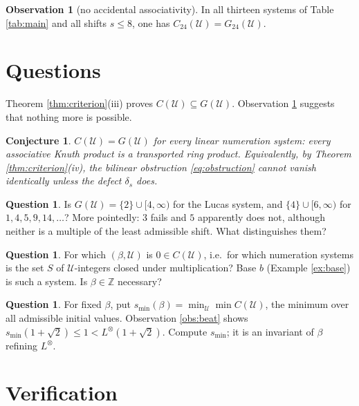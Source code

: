 \documentclass[11pt,reqno]{amsart}
\theoremstyle{plain}
\newtheorem{conjecture}[theorem]{Conjecture}
\theoremstyle{definition}
\newtheorem{observation}[theorem]{Observation}
\newtheorem{question}[theorem]{Question}
\newcommand{\Z}{\mathbb{Z}}
\newcommand{\Uu}{\mathcal{U}}
\begin{document}
\begin{observation}[no accidental associativity]\label{obs:noaccident}
In all thirteen systems of Table \ref{tab:main} and all shifts $s\le8$, one has
$C_{24}(\Uu)=G_{24}(\Uu)$.
\end{observation}

\section{Questions}

Theorem \ref{thm:criterion}(iii) proves $C(\Uu)\subseteq G(\Uu)$. Observation
\ref{obs:noaccident} suggests that nothing more is possible.

\begin{conjecture}\label{conj:noaccident}
$C(\Uu)=G(\Uu)$ for every linear numeration system: every associative Knuth product is a transported
ring product. Equivalently, by Theorem \ref{thm:criterion}(iv), the bilinear obstruction
\eqref{eq:obstruction} cannot vanish identically unless the defect $\delta_{s}$ does.
\end{conjecture}

\begin{question}\label{q:lucasodd}
Is $G(\Uu)=\{2\}\cup[4,\infty)$ for the Lucas system, and $\{4\}\cup[6,\infty)$ for
$1,4,5,9,14,\dots$? More pointedly: $3$ fails and $5$ apparently does not, although neither is a
multiple of the least admissible shift. What distinguishes them?
\end{question}

\begin{question}\label{q:zero}
For which $(\beta,\Uu)$ is $0\in C(\Uu)$, i.e.\ for which numeration systems is the set $S$ of
$\Uu$-integers closed under multiplication? Base $b$ (Example \ref{ex:base}) is such a system. Is
$\beta\in\Z$ necessary?
\end{question}

\begin{question}\label{q:invariant}
For fixed $\beta$, put $s_{\min}(\beta)=\min_{\Uu}\min C(\Uu)$, the minimum over all admissible
initial values. Observation \ref{obs:beat} shows $s_{\min}(1+\sqrt2)\le1<L^{\otimes}(1+\sqrt2)$.
Compute $s_{\min}$; it is an invariant of $\beta$ refining $L^{\otimes}$.
\end{question}

\appendix

\section{Verification}\label{sec:verification}
\end{document}
